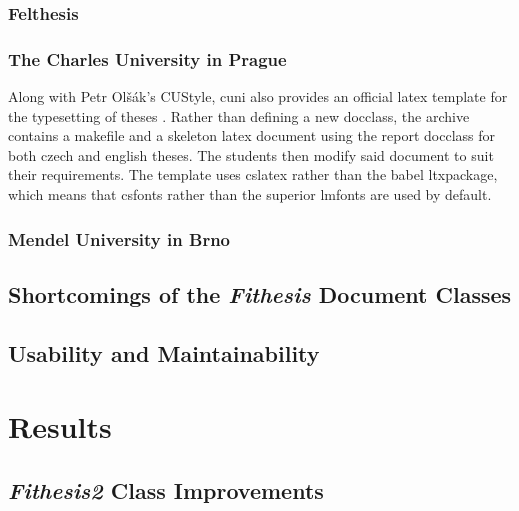       \subsection{Felthesis}
      \todo{}

      \subsection{The Charles University in Prague}
      Along with Petr Olšák's CUStyle, \gls{cuni} also provides an official \gls{latex} template for the typesetting of theses \cite{cunisablona}. Rather than defining a new \gls{docclass}, the archive contains a \gls{makefile} and a skeleton \gls{latex} document using the report \gls{docclass} for both czech and english theses. The students then modify said document to suit their requirements. The template uses \gls{cslatex} rather than the babel \gls{ltxpackage}, which means that \gls{csfonts} rather than the superior \gls{lmfonts} \cite{cslatexvsbabel} are used by default.

      \subsection{Mendel University in Brno}


    \section{Shortcomings of the \emph{Fithesis} Document Classes}
    \blindtext

    \section{Usability and Maintainability}
    \blindtext

  \chapter{Results}
    \blindtext

    \section{\emph{Fithesis2} Class Improvements}  
    \blindtext

